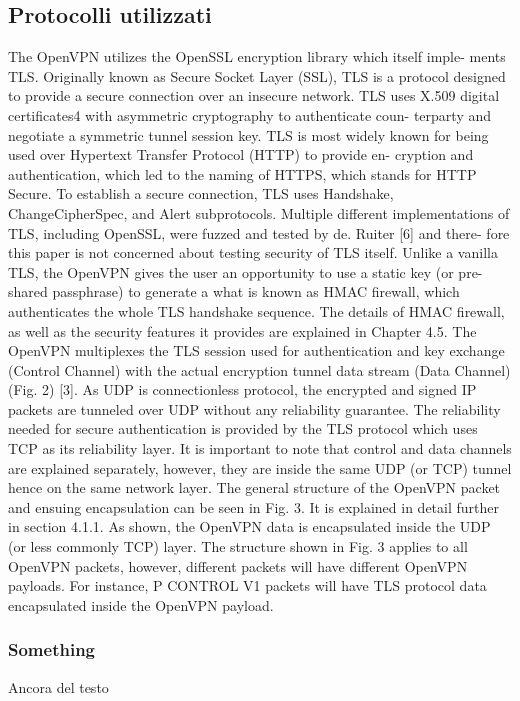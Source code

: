 \subsection{Protocolli utilizzati}
The OpenVPN utilizes the OpenSSL encryption library which itself imple- ments TLS. Originally known as Secure Socket Layer (SSL), TLS is a protocol designed to provide a secure connection over an insecure network. TLS uses X.509 digital certificates4 with asymmetric cryptography to authenticate coun- terparty and negotiate a symmetric tunnel session key. TLS is most widely known for being used over Hypertext Transfer Protocol (HTTP) to provide en- cryption and authentication, which led to the naming of HTTPS, which stands for HTTP Secure. To establish a secure connection, TLS uses Handshake, ChangeCipherSpec, and Alert subprotocols. Multiple different implementations of TLS, including OpenSSL, were fuzzed and tested by de. Ruiter [6] and there- fore this paper is not concerned about testing security of TLS itself.
Unlike a vanilla TLS, the OpenVPN gives the user an opportunity to use a static key (or pre-shared passphrase) to generate a what is known as HMAC firewall, which authenticates the whole TLS handshake sequence. The details of HMAC firewall, as well as the security features it provides are explained in Chapter 4.5. The OpenVPN multiplexes the TLS session used for authentication and key exchange (Control Channel) with the actual encryption tunnel data stream (Data Channel)(Fig. 2) [3]. As UDP is connectionless protocol, the encrypted and signed IP packets are tunneled over UDP without any reliability guarantee. The reliability needed for secure authentication is provided by the TLS protocol which uses TCP as its reliability layer. It is important to note that control and data channels are explained separately, however, they are inside the same UDP (or TCP) tunnel hence on the same network layer.
The general structure of the OpenVPN packet and ensuing encapsulation can be seen in Fig. 3. It is explained in detail further in section 4.1.1. As shown, the OpenVPN data is encapsulated inside the UDP (or less commonly TCP) layer. The structure shown in Fig. 3 applies to all OpenVPN packets, however, different packets will have different OpenVPN payloads. For instance, P CONTROL V1 packets will have TLS protocol data encapsulated inside the OpenVPN payload.


\subsubsection{Something}
Ancora del testo


